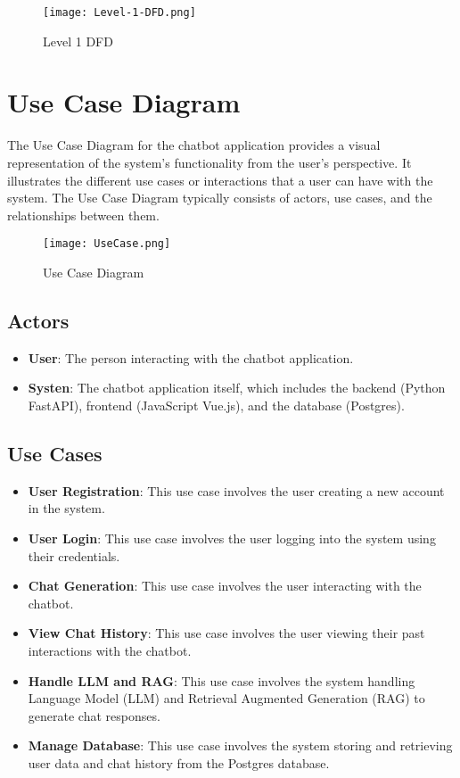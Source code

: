 \begin{figure}[h]
  \centering
  \texttt{[image: Level-1-DFD.png]}
  \caption{Level 1 DFD}\label{fig:level-1-dfd}
\end{figure}

\section{Use Case Diagram}
The Use Case Diagram for the chatbot application provides a visual representation of the system's functionality from the user's perspective. It illustrates the different use cases or interactions that a user can have with the system. The Use Case Diagram typically consists of actors, use cases, and the relationships between them.

\begin{figure}[h!]
  \centering
  \texttt{[image: UseCase.png]}
  \caption{Use Case Diagram}\label{fig:use-case-diagram}
\end{figure}

\subsection*{Actors}

\begin{itemize}
  \item \textbf{User}: The person interacting with the chatbot application.
  \item \textbf{Systen}: The chatbot application itself, which includes the backend (Python FastAPI), frontend (JavaScript Vue.js), and the database (Postgres).
\end{itemize}

\subsection*{Use Cases}

\begin{itemize}
  \item \textbf{User Registration}: This use case involves the user creating a new account in the system.
  \item \textbf{User Login}: This use case involves the user logging into the system using their credentials.
  \item \textbf{Chat Generation}: This use case involves the user interacting with the chatbot. 
  \item \textbf{View Chat History}: This use case involves the user viewing their past interactions with the chatbot.
  \item \textbf{Handle LLM and RAG}: This use case involves the system handling Language Model (LLM) and Retrieval Augmented Generation (RAG) to generate chat responses.
  \item \textbf{Manage Database}: This use case involves the system storing and retrieving user data and chat history from the Postgres database.
\end{itemize}

